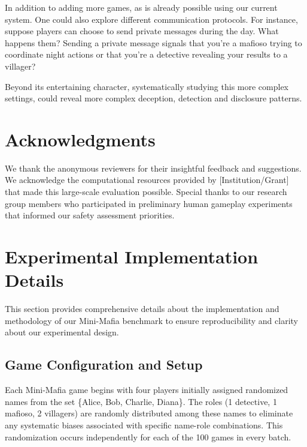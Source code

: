 \documentclass{article}
\begin{document}
In addition to adding more games, as is already possible using our current system. One could also explore different communication protocols. For instance, suppose players can choose to send private messages during the day. What happens them? Sending a private message signals that you're a mafioso trying to coordinate night actions or that you're a detective revealing your results to a villager?

Beyond its entertaining character, systematically studying this more complex settings, could reveal more complex deception, detection and disclosure patterns.


\section*{Acknowledgments}

We thank the anonymous reviewers for their insightful feedback and suggestions. We acknowledge the computational resources provided by [Institution/Grant] that made this large-scale evaluation possible. Special thanks to our research group members who participated in preliminary human gameplay experiments that informed our safety assessment priorities.







\appendix

\section{Experimental Implementation Details}
\label{appendix:experimental_details}

This section provides comprehensive details about the implementation and methodology of our Mini-Mafia benchmark to ensure reproducibility and clarity about our experimental design.

\subsection{Game Configuration and Setup}

Each Mini-Mafia game begins with four players initially assigned randomized names from the set \{Alice, Bob, Charlie, Diana\}. The roles (1 detective, 1 mafioso, 2 villagers) are randomly distributed among these names to eliminate any systematic biases associated with specific name-role combinations. This randomization occurs independently for each of the 100 games in every batch.
\end{document}
